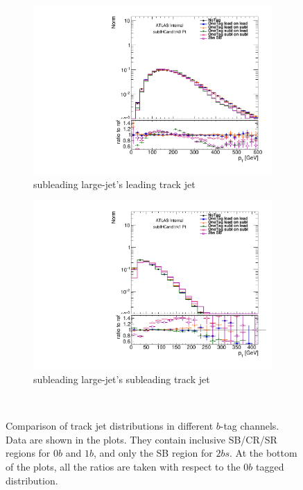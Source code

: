 \begin{figure}[htb!]
    \begin{subfigure}[b]{0.4\textwidth}
        \includegraphics[width=\textwidth,angle=-90]{figures/boosted/Prereweight/2bs_directcompare_sublHCand_trk0_Pt_1.pdf}
        \caption{subleading large-\R jet's leading track jet \pt}
        \label{fig:rw-2bs-comp-subl0}
    \end{subfigure}
    \quad \quad 
    \begin{subfigure}[b]{0.4\textwidth}
        \includegraphics[width=\textwidth,angle=-90]{figures/boosted/Prereweight/2bs_directcompare_sublHCand_trk1_Pt_1.pdf}
        \caption{subleading large-\R jet's subleading track jet \pt}
        \label{fig:rw-2bs-comp-subl1}
    \end{subfigure} \\ 
   \caption{
   Comparison of track jet \pt distributions in different $b$-tag channels. Data are shown in the plots. They contain inclusive SB/CR/SR regions for 0$b$ and $1b$, and only the SB region for $2bs$. At the bottom of the plots, all the ratios are taken with respect to the 0$b$ tagged distribution.}
  \label{fig:rw-2bs-comp}
\end{figure}


